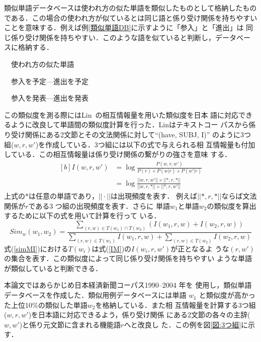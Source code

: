 \documentclass[japanese]{jnlp_1.4}
\newcounter{exp}
\def\exp#1{}
\def\toolref#1{}
\begin{document}
類似単語データベースは使われ方の似た単語を類似したものとして格納したもの
である．この場合の使われ方が似ているとは同じ語と係り受け関係を持ちやすい
ことを意味する．例えば例\ref{類似単語DB}に示すように「参入」と「進出」は
同じ係り受け関係を持ちやすい．このような語を似ていると判断し，データベー
スに格納する．

\begin{screen}
\exp{類似単語DB}　使われ方の似た単語


　参入を予定—進出を予定

　参入を発表—進出を発表
\end{screen}

この類似度を測る際にはLin~\cite{Lin:1998}の相互情報量を用いた類似度を日本
語に対応できるように改良して単語間の類似度計算を行った．Linはテキストコー
パスから係り受け関係にある2文節とその文法関係に対して``(have, SUBJ, I)''
のように3つ組($w, r, w'$)を作成している．3つ組には以下の式で与えられる相
互情報量も付加している．この相互情報量は係り受け関係の繋がりの強さを意味
する．
\begin{equation}
\begin{aligned}[b]
 I(w,r,w') & = \log\frac{P(w,r,w')}{P(r)\times P(w|r)\times P(w'|r)} \\
	   & = \log\frac{||w,r,w'||\times||*,r,*||}{||w,r,*||\times||*,r,w'||}
\end{aligned}\label{IM}
\end{equation}
上式の$*$は任意の単語であり，$||\cdot||$は出現頻度を表す．
例えば$||*,r,*||$ならば文法関係が$r$である3 つ組の出現頻度を表す．さらに
単語$w_1$と単語$w_2$の類似度を算出するために以下の式を用いて計算を行って
いる．
\begin{equation}
{Sim_w(w_1,w_2)}=\frac{\sum_{(r,w)\in T(w_1)\cap
  T(w_2)}(I(w_1,r,w)+I(w_2,r,w))}{\sum_{(r,w)\in
  T(w_1)}I(w_1,r,w)+\sum_{(r,w)\in T(w_2)}I(w_2,r,w)}
\label{simMI}
\end{equation}
式(\ref{simMI})における$T(w_i)$は式(\ref{IM})の$I(w_i,r,w')$が正となるよ
うな$(r,w')$の集合を表す．この類似度によって同じ係り受け関係を持ちやすい
ような単語が類似していると判断できる．

本論文ではあらかじめ日本経済新聞コーパス1990--2004 年\toolref{言語資源:日経}を
使用し，類似単語データベースを作成した．類似用例データベースには単語
$w_1$ と類似度が高かった上位10\%の類似した単語$w_2$を格納している．また相
互情報量を計算する3つ組($w, r, w'$)を日本語に対応できるよう，係り受け関係
にある2文節の各々の主辞($w, w'$)と係り元文節に含まれる機能語$r$へと改良し
た．この例を図\ref{図:3つ組}に示す．
\end{document}
